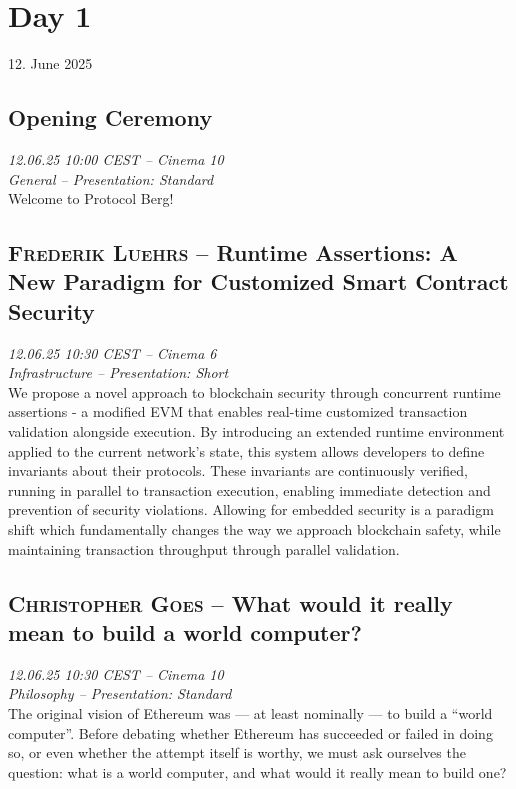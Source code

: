 
\section {Day 1} 12. June 2025\cleardoublepage
\subsection {Opening Ceremony} \noindent \textit {12.06.25 10:00 CEST -- Cinema 10\\ General -- Presentation: Standard}\\[1em] Welcome to Protocol Berg!

\clearpage
\subsection {\textsc{Frederik Luehrs}  -- Runtime Assertions: A New Paradigm for Customized Smart Contract Security} \noindent \textit {12.06.25 10:30 CEST -- Cinema 6\\ Infrastructure -- Presentation: Short}\\[1em] We propose a novel approach to blockchain security through concurrent runtime assertions - a modified EVM that enables real-time customized transaction validation alongside execution.
By introducing an extended runtime environment applied to the current network's state, this system allows developers to define invariants about their protocols. These invariants are continuously verified, running in parallel to transaction execution, enabling immediate detection and prevention of security violations.
Allowing for embedded security is a paradigm shift which fundamentally changes the way we approach blockchain safety, while maintaining transaction throughput through parallel validation.

\clearpage
\subsection {\textsc{Christopher Goes}  -- What would it really mean to build a world computer?} \noindent \textit {12.06.25 10:30 CEST -- Cinema 10\\ Philosophy -- Presentation: Standard}\\[1em] The original vision of Ethereum was — at least nominally — to build a ``world computer''. Before debating whether Ethereum has succeeded or failed in doing so, or even whether the attempt itself is worthy, we must ask ourselves the question: what is a world computer, and what would it really mean to build one?

